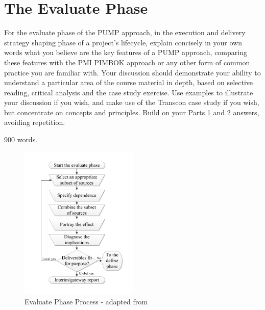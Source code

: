 \section{The Evaluate Phase} \label{s:Evaluate}

For the evaluate phase of the PUMP approach, in the execution and delivery strategy shaping phase of a project’s lifecycle, explain concisely in your own words what you believe are the key features of a PUMP approach, comparing these features with the PMI PIMBOK approach or any other form of common practice you are familiar with. Your discussion should demonstrate your ability to understand a particular area of the course material in depth, based on selective reading, critical analysis and the case study exercise. Use examples to illustrate your discussion if you wish, and make use of the Transcon case study if you wish, but concentrate on concepts and principles. Build on your Parts 1 and 2 answers, avoiding repetition.

900 words.

\begin{figure}[!h]
  \centering
    \includegraphics[width = 0.5\textwidth]{./Figures/Evaluate.pdf} 
\caption{Evaluate Phase Process - adapted from \cite{chapman}}
\label{Figure:Identify}
\end{figure}
